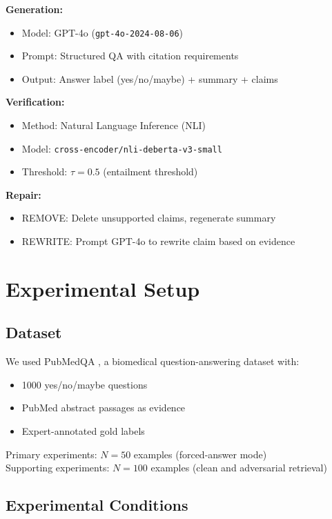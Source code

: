 \documentclass[11pt]{article}
\begin{document}
\textbf{Generation:}
\begin{itemize}
\item Model: GPT-4o (\texttt{gpt-4o-2024-08-06})
\item Prompt: Structured QA with citation requirements
\item Output: Answer label (yes/no/maybe) + summary + claims
\end{itemize}

\textbf{Verification:}
\begin{itemize}
\item Method: Natural Language Inference (NLI)
\item Model: \texttt{cross-encoder/nli-deberta-v3-small}
\item Threshold: $\tau = 0.5$ (entailment threshold)
\end{itemize}

\textbf{Repair:}
\begin{itemize}
\item REMOVE: Delete unsupported claims, regenerate summary
\item REWRITE: Prompt GPT-4o to rewrite claim based on evidence
\end{itemize}

\section{Experimental Setup}

\subsection{Dataset}

We used PubMedQA \cite{jin2019pubmedqa}, a biomedical question-answering dataset with:
\begin{itemize}
\item 1000 yes/no/maybe questions
\item PubMed abstract passages as evidence
\item Expert-annotated gold labels
\end{itemize}

Primary experiments: $N=50$ examples (forced-answer mode)\\
Supporting experiments: $N=100$ examples (clean and adversarial retrieval)

\subsection{Experimental Conditions}
\end{document}
